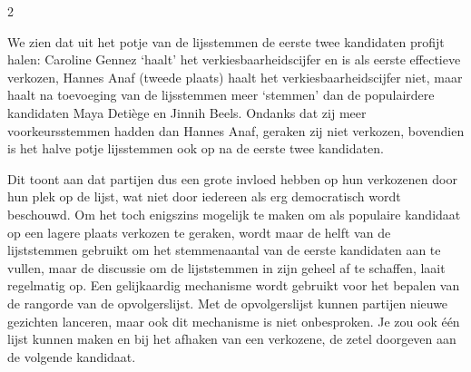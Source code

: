\begin{multicols}{2}
\begin{tabel}
\caption{De voorkeursstemmen worden in volgorde van de kandidatenlijst aangevuld met de halve pot lijststemmen tot het verkiesbaarheidscijfer}
\label{aanvullen}
\end{tabel}
We zien dat uit het potje van de lijsstemmen de eerste twee kandidaten profijt halen: Caroline Gennez `haalt' het verkiesbaarheidscijfer en is als eerste effectieve verkozen, Hannes Anaf (tweede plaats) haalt het verkiesbaarheidscijfer niet, maar haalt na toevoeging van de lijsstemmen meer `stemmen' dan de populairdere kandidaten Maya Detiège en Jinnih Beels. Ondanks dat zij meer voorkeursstemmen hadden dan Hannes Anaf, geraken zij niet verkozen, bovendien is het halve potje lijsstemmen ook op na de eerste twee kandidaten. 

Dit toont aan dat partijen dus een grote invloed hebben op hun verkozenen door hun plek op de lijst, wat niet door iedereen als erg democratisch wordt beschouwd.  Om het toch enigszins mogelijk te maken om als populaire kandidaat op een lagere plaats verkozen te geraken, wordt maar de helft van de lijststemmen gebruikt om het stemmenaantal van de eerste kandidaten aan te vullen, maar de discussie om de lijststemmen in zijn geheel af te schaffen, laait regelmatig op. Een gelijkaardig mechanisme wordt gebruikt voor het bepalen van de rangorde van de opvolgerslijst. Met de opvolgerslijst kunnen partijen nieuwe gezichten lanceren, maar ook dit mechanisme is niet onbesproken. Je zou ook één lijst kunnen maken en bij het afhaken van een verkozene, de zetel doorgeven aan de volgende kandidaat.


\end{multicols}
